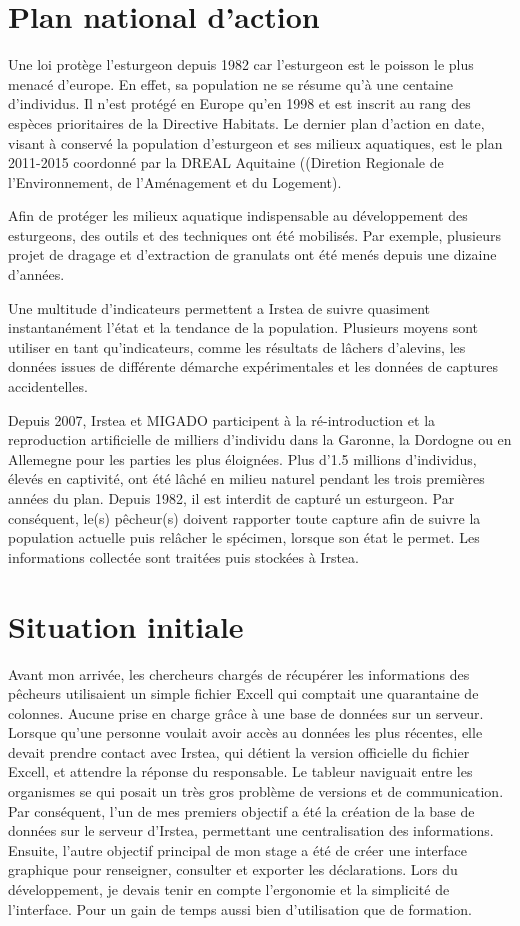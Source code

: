 \documentclass[12pt,a4paper,titlepage,twoside]{report}
\begin{document}
\section{Plan national d'action}
Une loi protège l'esturgeon depuis 1982 car l'esturgeon est le poisson le plus menacé d'europe. En effet, sa population ne se résume qu'à une centaine d'individus. Il n'est protégé en Europe qu'en 1998 et est inscrit au rang des espèces prioritaires de la Directive Habitats. Le dernier plan d'action en date, visant à conservé la population d'esturgeon et ses milieux aquatiques, est le plan 2011-2015 coordonné par la DREAL Aquitaine ((Diretion Regionale de l'Environnement, de l'Aménagement et du Logement).

Afin de protéger les milieux aquatique indispensable au développement des esturgeons, des outils et des techniques ont été mobilisés. Par exemple, plusieurs projet de dragage et d'extraction de granulats ont été menés depuis une dizaine d'années.

Une multitude d'indicateurs permettent a Irstea de suivre quasiment instantanément l'état et la tendance de la population. Plusieurs moyens sont utiliser en tant qu'indicateurs, comme les résultats de lâchers d'alevins, les données issues de différente démarche expérimentales et les données de captures accidentelles.
 
Depuis 2007, Irstea et MIGADO participent à la ré-introduction et la reproduction artificielle de milliers d'individu dans la Garonne, la Dordogne ou en Allemegne pour les parties les plus éloignées. Plus d'1.5 millions d'individus, élevés en captivité, ont été lâché en milieu naturel pendant les trois premières années du plan. 
Depuis 1982, il est interdit de capturé un esturgeon. Par conséquent, le(s) pêcheur(s) doivent rapporter toute capture afin de suivre la population actuelle puis relâcher le spécimen, lorsque son état le permet. Les informations collectée sont traitées puis stockées à Irstea.

\section{Situation initiale}
Avant mon arrivée, les chercheurs chargés de récupérer les informations des pêcheurs utilisaient un simple fichier Excell qui comptait une quarantaine de colonnes. Aucune prise en charge grâce à une base de données sur un serveur. Lorsque qu'une personne voulait avoir accès au données les plus récentes, elle devait prendre contact avec Irstea, qui détient la version officielle du fichier Excell, et attendre la réponse du responsable. Le tableur naviguait entre les organismes se qui posait un très gros problème de versions et de communication. Par conséquent, l'un de mes premiers objectif a été la création de la base de données sur le serveur d'Irstea, permettant une centralisation des informations. Ensuite, l'autre objectif principal de mon stage a été de créer une interface graphique pour renseigner, consulter et exporter les déclarations. Lors du développement, je devais tenir en compte l'ergonomie et la simplicité de l'interface. Pour un gain de temps aussi bien d'utilisation que de formation.
\end{document}
